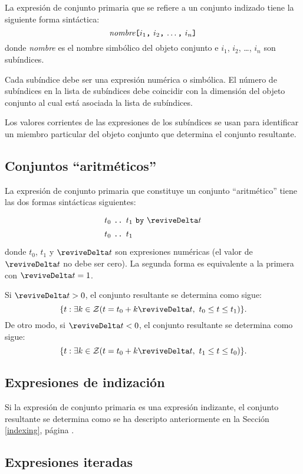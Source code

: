 \documentclass[11pt,spanish]{report}
\begin{document}
La expresión de conjunto primaria que se refiere a un conjunto indizado tiene la siguiente forma sintáctica:
$$\mbox{{\it nombre}{\tt[}$i_1${\tt,} $i_2${\tt,} \dots{\tt,}
$i_n${\tt]}}$$
donde {\it nombre} es el nombre simbólico del objeto conjunto e $i_1$, $i_2$,
\dots, $i_n$ son subíndices.

Cada subíndice debe ser una expresión numérica o simbólica. El número de subíndices en la lista de subíndices debe coincidir con la dimensión del objeto conjunto al cual está asociada la lista de subíndices.

Los valores corrientes de las expresiones de los subíndices se usan para identificar un miembro particular del objeto conjunto que determina el conjunto resultante.

\subsection{Conjuntos ``aritméticos''}

La expresión de conjunto primaria que constituye un conjunto ``aritmético'' tiene las dos formas sintácticas siguientes:
$$
{\def\arraystretch{1.4}
\begin{array}{l}
\mbox{$t_0$ {\tt..} $t_1$ {\tt by} $\reviveDelta t$}\\
\mbox{$t_0$ {\tt..} $t_1$}\\
\end{array}
}
$$
donde $t_0$, $t_1$ y $\reviveDelta t$ son expresiones numéricas (el valor de
$\reviveDelta t$ no debe ser cero). La segunda forma es equivalente a la primera con $\reviveDelta t=1$.

Si $\reviveDelta t>0$, el conjunto resultante se determina como sigue:
$$\{t:\exists k\in{\cal Z}(t=t_0+k\reviveDelta t,\ t_0\leq t\leq t_1)\}.$$
De otro modo, si $\reviveDelta t<0$, el conjunto resultante se determina como sigue:
$$\{t:\exists k\in{\cal Z}(t=t_0+k\reviveDelta t,\ t_1\leq t\leq t_0)\}.$$

\subsection{Expresiones de indización}

Si la expresión de conjunto primaria es una expresión indizante, el conjunto resultante se determina como se ha descripto anteriormente en la Sección \ref{indexing}, página \pageref{indexing}.

\subsection{Expresiones iteradas}
\end{document}
